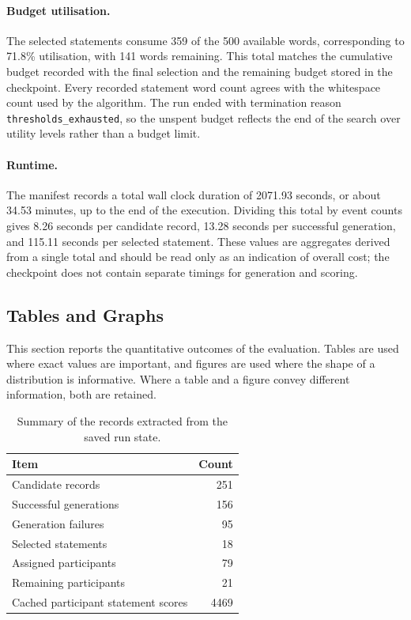 \documentclass[letterpaper,11pt]{article}
\theoremstyle{plain}
\theoremstyle{definition}
\begin{document}
\paragraph{Budget utilisation.}
The selected statements consume 359 of the 500 available words, corresponding to 71.8\% utilisation, with 141 words remaining. This total matches the cumulative budget recorded with the final selection and the remaining budget stored in the checkpoint. Every recorded statement word count agrees with the whitespace count used by the algorithm. The run ended with termination reason \texttt{thresholds\_exhausted}, so the unspent budget reflects the end of the search over utility levels rather than a budget limit.

\paragraph{Runtime.}
The manifest records a total wall clock duration of 2071.93 seconds, or about 34.53 minutes, up to the end of the execution. Dividing this total by event counts gives 8.26 seconds per candidate record, 13.28 seconds per successful generation, and 115.11 seconds per selected statement. These values are aggregates derived from a single total and should be read only as an indication of overall cost; the checkpoint does not contain separate timings for generation and scoring.

\subsection{Tables and Graphs}

This section reports the quantitative outcomes of the evaluation. Tables are used where exact values are important, and figures are used where the shape of a distribution is informative. Where a table and a figure convey different information, both are retained.

\begin{table}[H]
\centering
\caption{{Summary of the records extracted from the saved run state.}}
\label{tab:extracted}
\begin{tabular}{lr}
\toprule
Item & Count \\
\midrule
Candidate records & 251 \\
Successful generations & 156 \\
Generation failures & 95 \\
Selected statements & 18 \\
Assigned participants & 79 \\
Remaining participants & 21 \\
Cached participant statement scores & 4469 \\
\bottomrule
\end{tabular}
\end{table}
\end{document}
